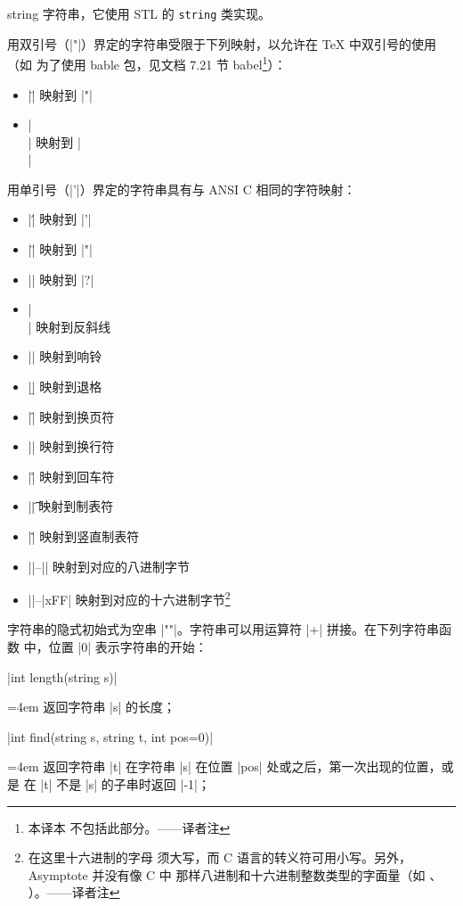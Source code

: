 \documentclass{ctexbook}
\makeatletter
\newenvironment{funclist}{\trivlist
  \parindent=0pt
\item[]
  \def\item{\medskip\par\leftskip=0pt}
  \def\go{\par\leftskip=4em}}
{\endtrivlist}
\newenvironment{typelist}{\itemize
  \let\old@item\@item
  \def\@item[##1]{\expandafter\old@item[\ttfamily\color{type!50!black}##1]}}
{\enditemize}
\newcommand*\prgname[1]{\textsf{#1}}
\newcommand\transnote[1]{\footnote{#1——译者注}}
\makeatother
\begin{document}
\begin{typelist}
\item[string] 字符串，它使用 STL 的 \verb=string= 类实现。

用双引号（|"|）界定的字符串受限于下列映射，以允许在 \TeX{} 中双引号的使用（如
为了使用 \prgname{bable} 包，见文档 7.21 节 \prgname{babel}\transnote{本译本
不包括此部分。}）：
\begin{itemize}
  \item |\"| 映射到 |"|
  \item |\\| 映射到 |\\|
\end{itemize}

用单引号（|'|）界定的字符串具有与 ANSI C 相同的字符映射：
\begin{itemize}
  \item |\'| 映射到 |'|
  \item |\"| 映射到 |"|
  \item |\?| 映射到 |?|
  \item |\\| 映射到反斜线
  \item |\a| 映射到响铃
  \item |\b| 映射到退格
  \item |\f| 映射到换页符
  \item |\n| 映射到换行符
  \item |\r| 映射到回车符
  \item |\t| 映射到制表符
  \item |\v| 映射到竖直制表符
  \item |\0|--|| 映射到对应的八进制字节
  \item ||--|xFF| 映射到对应的十六进制字节\transnote{在这里十六进制的字母
须大写，而 C 语言的转义符可用小写。另外，\prgname{Asymptote} 并没有像 C 中
那样八进制和十六进制整数类型的字面量（如 \inlinecode{0177}、
\inlinecode{0x2F}）。}
\end{itemize}

字符串的隐式初始式为空串 |""|。字符串可以用运算符 |+| 拼接。在下列字符串函数
中，位置 |0| 表示字符串的开始：
\begin{funclist}
\item |int length(string s)| \go
  返回字符串 |s| 的长度；

\item |int find(string s, string t, int pos=0)| \go
  返回字符串 |t| 在字符串 |s| 在位置 |pos| 处或之后，第一次出现的位置，或是
  在 |t| 不是 |s| 的子串时返回 |-1|；


\end{funclist}
\end{typelist}
\end{document}
